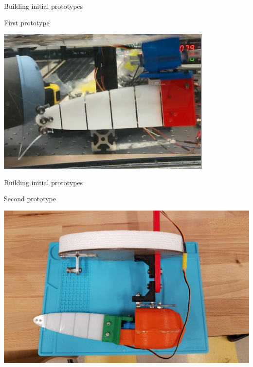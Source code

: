 \documentclass[aspectratio=169, xcolor=table]{beamer}
\begin{document}


\begin{frame}{Building initial prototypes}
\begin{block}{First prototype}
\begin{center}
\includegraphics[scale=0.7]{1st_PR.png}
\end{center}
\end{block}
\end{frame}

\begin{frame}{Building initial prototypes}
\begin{block}{Second prototype}
\begin{center}
\includegraphics[scale=0.27]{2nd_PR.jpg}
\end{center}
\end{block}
\end{frame}
\end{document}
